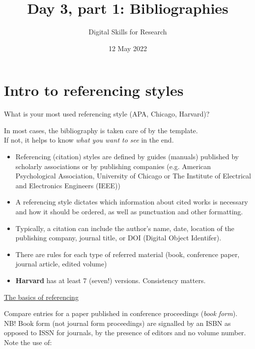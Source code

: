 \documentclass[a4paper,11pt]{article}
\title{Day 3, part 1: Bibliographies}
\author{Digital Skills for Research}
\date{12 May 2022}
\begin{document}
	
\clearpage
\maketitle
\thispagestyle{empty}

\tableofcontents

\section{Intro to referencing styles}

\begin{tcolorbox}[colback=red!5!white, colframe=red!75!black]
	\centering
	{\Large{What is your most used referencing style (APA, Chicago, Harvard)?}}
\end{tcolorbox}
\bigskip
In most cases, the bibliography is taken care of by the template. \\
If not, it helps to know \emph{what you want to see} in the end. 
\bigskip

\begin{itemize}
	\item Referencing (citation) styles are defined by guides (manuals) published by scholarly associations or by publishing companies (e.g. American Psychological Association, University of Chicago or The Institute of Electrical and Electronics Engineers (IEEE))
	\item A referencing style dictates which information about cited works is necessary and how it should be ordered, as well as punctuation and other formatting.
	\item Typically, a citation can include the author's name, date, location of the publishing company, journal title, or DOI (Digital Object Identifer).
	\item There are rules for each type of referred material (book, conference paper, journal article, edited volume)
	\item \textbf{Harvard} has at least 7 (seven!) versions. Consistency matters. 
\end{itemize}

\href{https://www.citethemrightonline.com/Basics}{\underline{The basics of referencing}}

\medskip

Compare entries for a paper published in conference proceedings (\emph{book form}).\\
NB! Book form (not journal form proceedings) are signalled by an ISBN as opposed to  ISSN for journals, by the presence of editors and no volume number.\\
\medskip
Note the use of:
\end{document}
